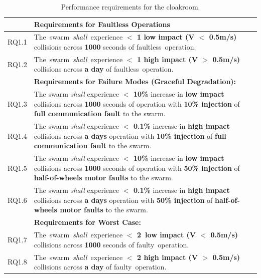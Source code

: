 \documentclass[lettersize,journal]{IEEEtran}
\begin{document}
\begin{table}[!t]
	\centering
	\begin{tabular}{|p{7mm}|p{72mm}|}
		\hline
		& \textbf{Requirements for Faultless Operations} \\
		\hline
		RQ1.1 & The swarm \emph{shall} experience \textbf{$<$ 1 low impact (V $<$ 0.5m/s)} collisions across \textbf{1000} seconds of faultless operation. \\ 
		\hline
		RQ1.2 & The swarm \emph{shall} experience \textbf{$<$ 1 high impact (V $>$ 0.5m/s)} collisions across \textbf{a day} of faultless operation. \\ 
		\hline
		& \textbf{Requirements for Failure Modes (Graceful Degradation): } \\
		\hline
		RQ1.3 & The swarm \emph{shall} experience \textbf{$<$ 10\%} increase in \textbf{low impact} collisions across \textbf{1000} seconds of operation with \textbf{10\% injection} of \textbf{full communication fault} to the swarm. \\
		\hline
		RQ1.4 & The swarm \emph{shall} experience \textbf{$<$ 0.1\%} increase in \textbf{high impact} collisions across \textbf{a days} operation with \textbf{10\% injection} of \textbf{full communication fault} to the swarm.\\ 
		\hline
		RQ1.5 & The swarm \emph{shall} experience \textbf{$<$ 10\%} increase in \textbf{low impact} collisions across \textbf{1000} seconds of operation with \textbf{50\% injection} of \textbf{half-of-wheels motor faults} to the swarm.\\
		\hline
		RQ1.6 & The swarm \emph{shall} experience \textbf{$<$ 0.1\%} increase in \textbf{high impact} collisions across \textbf{a days} operation with \textbf{50\% injection} of \textbf{half-of-wheels motor faults} to the swarm.	\\	
		\hline
		& \textbf{Requirements for Worst Case: } \\
		\hline
		RQ1.7 & The swarm \emph{shall} experience \textbf{$<$ 2 low impact (V $<$ 0.5m/s)} collisions across \textbf{1000} seconds of faulty operation. \\			\hline	
		RQ1.8 & The swarm \emph{shall} experience \textbf{$<$ 2 high impact (V $>$ 0.5m/s)} collisions across \textbf{a day} of faulty operation.  \\		[1ex] 		
		\hline
	\end{tabular}
	\caption{\label{tab:perormance}Performance requirements for the cloakroom.}
\end{table}    
\end{document}
